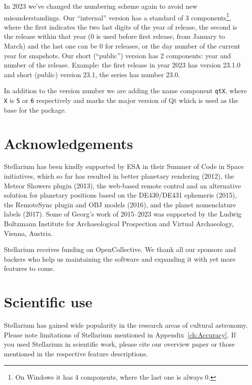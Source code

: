 In 2023 we've changed the numbering scheme again to avoid new misunderstandings. 
Our ``internal'' version has a standard of 3 components\footnote{On Windows 
it has 4 components, where the last one is always 0.}, where the first indicates 
the two last digits of the year of release, the second is the release within 
that year (0 is used before first release, from January to March) and the last 
one can be 0 for releases, or the day number of the current year for snapshots. 
Our short (``public'') version has 2 components: year 
and number of the release. Example: the first release in year 2023 has 
version 23.1.0 and short (public) version 23.1, the series has number 23.0.

In addition to the version number we are adding the name component \texttt{qtX}, 
where \texttt{X} is \texttt{5} or \texttt{6} respectively and marks the 
major version of Qt which is used as the base for the package.

\section{Acknowledgements}
Stellarium has been kindly supported by ESA in their Summer of Code in
Space initiatives, which so far has resulted in better planetary rendering
(2012), the Meteor Showers plugin (2013), the web-based remote
control and an alternative solution for planetary positions based on
the DE430/DE431 ephemeris (2015), the RemoteSync plugin and OBJ models (2016), 
and the planet nomenclature labels (2017). Some of Georg's work of 2015--2023 was
supported by the Ludwig Boltzmann Institute for Archaeological
Prospection and Virtual Archaeology, Vienna, Austria. 

Stellarium receives funding on OpenCollective. We thank all our sponsors and backers 
who help us maintaining the software and expanding it with yet more features to come.

\section{Scientific use}

Stellarium has gained wide popularity in the research areas of
cultural astronomy. Please note limitations of Stellarium mentioned in
Appendix~\ref{ch:Accuracy}. If you used Stellarium in scientific work,
please cite our overview paper \citep{Zotti-etal:JSA2020.6.2} or those
mentioned in the respective feature descriptions.

